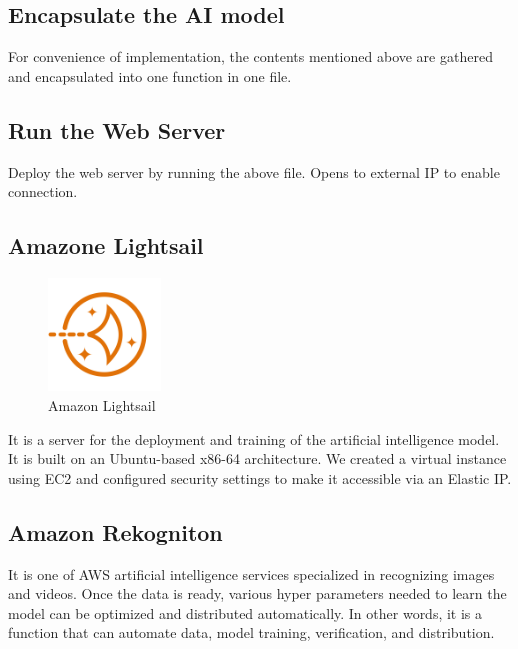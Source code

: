\subsection{\textbf{Encapsulate the AI model}}
For convenience of implementation, the contents mentioned above are gathered and encapsulated into one function in one file.\\
\subsection{\textbf{Run the Web Server}}
Deploy the web server by running the above file. Opens to external IP to enable connection.\\

\subsection{\textbf{Amazone Lightsail}}

\begin{figure}[htp]
\centering
\includegraphics[width=3cm]{images/aws lightsail.png}
\caption{Amazon Lightsail}
\label{fig:aws}
\end{figure}

It is a server for the deployment and training of the artificial intelligence model. It is built on an Ubuntu-based x86-64 architecture. We created a virtual instance using EC2 and configured security settings to make it accessible via an Elastic IP.\\

\subsection{\textbf{Amazon Rekogniton}}

It is one of AWS artificial intelligence services specialized in recognizing images and videos. Once the data is ready, various hyper parameters needed to learn the model can be optimized and distributed automatically. In other words, it is a function that can automate data, model training, verification, and distribution.


